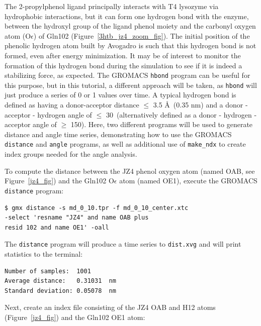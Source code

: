 \documentclass[9pt,tutorial]{livecoms}
\begin{document}
The 2-propylphenol ligand principally interacts with T4 lysozyme via hydrophobic interactions, but it can form one hydrogen bond with the enzyme, between the hydroxyl group of the ligand phenol moiety and the carbonyl oxygen atom (O$\epsilon$) of Gln102 (Figure~\ref{3htb_jz4_zoom_fig}). The initial position of the phenolic hydrogen atom built by Avogadro is such that this hydrogen bond is not formed, even after energy minimization. It may be of interest to monitor the formation of this hydrogen bond during the simulation to see if it is indeed a stabilizing force, as expected. The GROMACS \texttt{hbond} program can be useful for this purpose, but in this tutorial, a different approach will be taken, as \texttt{hbond} will just produce a series of 0 or 1 values over time. A typical hydrogen bond is defined as having a donor-acceptor distance $\le$ 3.5 \AA~(0.35 nm) and a donor - acceptor - hydrogen angle of $\le$ 30\textdegree~(alternatively defined as a donor - hydrogen - acceptor angle of $\ge$ 150\textdegree). Here, two different programs will be used to generate distance and angle time series, demonstrating how to use the GROMACS \texttt{distance} and \texttt{angle} programs, as well as additional use of \texttt{make\_ndx} to create index groups needed for the angle analysis.

To compute the distance between the JZ4 phenol oxygen atom (named OAB, see Figure~\ref{jz4_fig}) and the Gln102 O$\epsilon$ atom (named OE1), execute the GROMACS \texttt{distance} program:

\begin{verbatim}
$ gmx distance -s md_0_10.tpr -f md_0_10_center.xtc
-select 'resname "JZ4" and name OAB plus 
resid 102 and name OE1' -oall
\end{verbatim}

The \texttt{distance} program will produce a time series to \texttt{dist.xvg} and will print statistics to the terminal:

\begin{verbatim}
Number of samples:  1001
Average distance:   0.31031  nm
Standard deviation: 0.05078  nm
\end{verbatim}

Next, create an index file consisting of the JZ4 OAB and H12 atoms (Figure~\ref{jz4_fig}) and the Gln102 OE1 atom:
\end{document}
